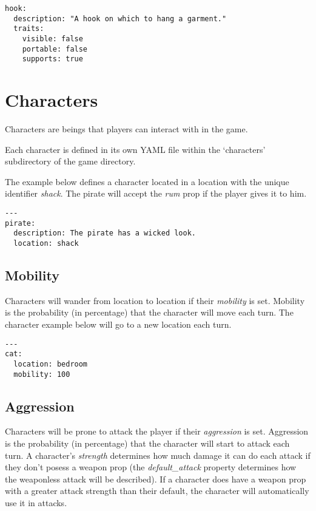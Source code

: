 \documentclass[letterpaper,10pt,english]{sphinxmanual}
\begin{document}
\begin{Verbatim}[commandchars=@\[\]]
hook:
  description: "A hook on which to hang a garment."
  traits:
    visible: false
    portable: false
    supports: true
\end{Verbatim}


\section{Characters}
\label{elements:characters}
Characters are beings that players can interact with in the game.

Each character is defined in its own YAML file within the `characters' subdirectory of the game directory.

The example below defines a character located in a location with the unique identifier \emph{shack}. The pirate will accept the \emph{rum} prop if the player gives it to him.

\begin{Verbatim}[commandchars=@\[\]]
---
pirate:
  description: The pirate has a wicked look.
  location: shack
\end{Verbatim}


\subsection{Mobility}
\label{elements:mobility}
Characters will wander from location to location if their \emph{mobility} is set. Mobility is the probability (in percentage) that the character will move each turn. The character example below will go to a new location each turn.

\begin{Verbatim}[commandchars=@\[\]]
---
cat:
  location: bedroom
  mobility: 100
\end{Verbatim}


\subsection{Aggression}
\label{elements:aggression}
Characters will be prone to attack the player if their \emph{aggression} is set. Aggression is the probability (in percentage) that the character will start to attack each turn. A character's \emph{strength} determines how much damage it can do each attack if they don't posess a weapon prop (the \emph{default\_attack} property determines how the weaponless attack will be described). If a character does have a weapon prop with a greater attack strength than their default, the character will automatically use it in attacks.
\end{document}
